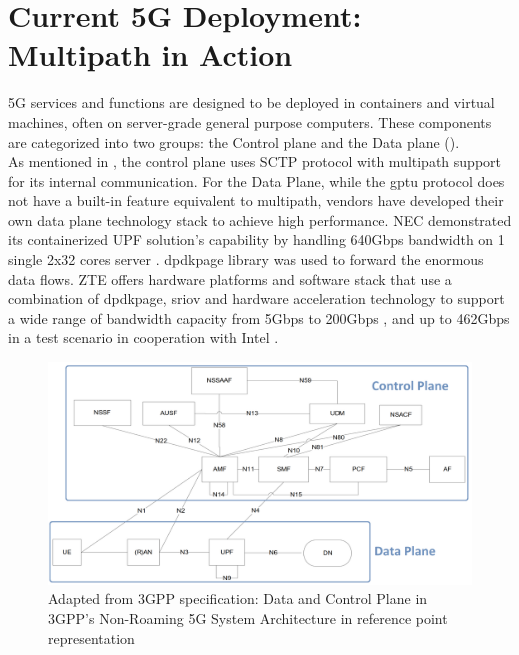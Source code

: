 \section{Current 5G Deployment: Multipath in Action}
5G services and functions are designed to be deployed in containers and virtual machines, often on server-grade general purpose computers.
These components are categorized into two groups: the Control plane and the Data plane ().
\\

As mentioned in , the control plane uses \ac{SCTP} protocol with multipath support for its internal communication.
For the Data Plane, while the \ac{gptu} protocol does not have a built-in feature equivalent to multipath, vendors have developed their own data plane technology stack to achieve high performance.
\ac{NEC} demonstrated its containerized \ac{UPF} solution's capability by handling 640Gbps bandwidth on 1 single 2x32 cores server \cite{nec_upf_whitepaper}.
\ac{dpdkpage} library was used to forward the enormous data flows.
\ac{ZTE} offers hardware platforms and software stack that use a combination of \ac{dpdkpage}, \ac{sriov} and hardware acceleration technology to support a wide range of bandwidth capacity from 5Gbps to 200Gbps \cite{zte_upf_full_whitepaper}, and up to 462Gbps in a test scenario in cooperation with Intel \cite{zte_5g_core_upf_impl}.

\begin{figure}[H]
	\centering
	\includegraphics[width=1.0\textwidth]{resources/images/Non_Roaming_5G_System_Architecture_in_reference_point_representation.png}
	\caption{Adapted from 3GPP specification: Data and Control Plane in 3GPP's Non-Roaming 5G System Architecture in reference point representation \cite{3gpp_5g_system_architect_spec_release_18}}
	\label{fig:related_work:Non_Roaming_5G_System_Architecture_in_reference_point_representation}
\end{figure}

